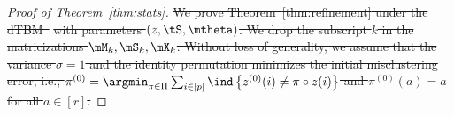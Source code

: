 \documentclass[lettersize,onecolumn,journal]{IEEEtran}
\theoremstyle{definition}
\theoremstyle{definition}
\newtheorem{assumption}{Assumption}
\newtheorem{rmk}{Remark}
\newcommand{\offf}[1]{\left\{#1\right\}}
\providecommand{\DIFdeltex}[1]{{\protect\color{red}\sout{#1}}}                      %
\providecommand{\DIFdel}[1]{\texorpdfstring{\DIFdeltex{#1}}{}} %
\begin{document}
\begin{proof}[Proof of Theorem~\ref{thm:stats}]



\DIFdel{We prove Theorem~\ref{thm:refinement} under the dTBM~}%
\DIFdel{with parameters $(z, \tS, \mtheta)$. We drop the subscript $k$ in the matricizations $\mM_k, \mS_k, \mX_k$. Without loss of generality, we assume that the variance $\sigma = 1$ and the identity permutation minimizes the initial misclustering error, i.e., $\pi^{(0)} = \argmin_{\pi \in \Pi} \sum_{i \in [p]}\ind \offf{z^{(0)}(i) \neq \pi \circ z(i) }$ and $\pi^{(0)}(a) = a$ for all $ a \in [r]$.
}%


\end{proof}
\end{document}
